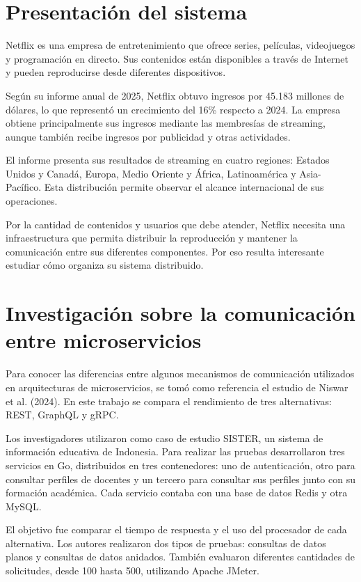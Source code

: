 \section{Presentación del sistema}

Netflix es una empresa de entretenimiento que ofrece series, películas, videojuegos y programación en directo. Sus contenidos están disponibles a través de Internet y pueden reproducirse desde diferentes dispositivos.

Según su informe anual de 2025, Netflix obtuvo ingresos por 45.183 millones de dólares, lo que representó un crecimiento del 16\% respecto a 2024. La empresa obtiene principalmente sus ingresos mediante las membresías de streaming, aunque también recibe ingresos por publicidad y otras actividades.

El informe presenta sus resultados de streaming en cuatro regiones: Estados Unidos y Canadá, Europa, Medio Oriente y África, Latinoamérica y Asia-Pacífico. Esta distribución permite observar el alcance internacional de sus operaciones.

Por la cantidad de contenidos y usuarios que debe atender, Netflix necesita una infraestructura que permita distribuir la reproducción y mantener la comunicación entre sus diferentes componentes. Por eso resulta interesante estudiar cómo organiza su sistema distribuido.

\parencite{netflix2025annual}


\section{Investigación sobre la comunicación entre microservicios}

Para conocer las diferencias entre algunos mecanismos de comunicación utilizados en arquitecturas de microservicios, se tomó como referencia el estudio de Niswar et al. (2024). En este trabajo se compara el rendimiento de tres alternativas: REST, GraphQL y gRPC.

Los investigadores utilizaron como caso de estudio SISTER, un sistema de información educativa de Indonesia. Para realizar las pruebas desarrollaron tres servicios en Go, distribuidos en tres contenedores: uno de autenticación, otro para consultar perfiles de docentes y un tercero para consultar sus perfiles junto con su formación académica. Cada servicio contaba con una base de datos Redis y otra MySQL.

El objetivo fue comparar el tiempo de respuesta y el uso del procesador de cada alternativa. Los autores realizaron dos tipos de pruebas: consultas de datos planos y consultas de datos anidados. También evaluaron diferentes cantidades de solicitudes, desde 100 hasta 500, utilizando Apache JMeter.

